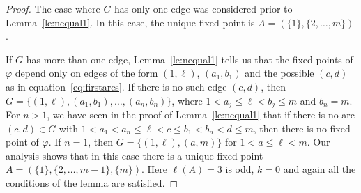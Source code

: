 \documentclass[10pt]{amsart}
\theoremstyle{definition}
\begin{document}
\begin{proof} 

The case where $G$ has only one edge was considered prior to Lemma~\ref{le:nequal1}. In this case, the unique fixed point is $A=(\{1\},\{2,\ldots,m\})$. 

If $G$ has more than one edge,
Lemma~\ref{le:nequal1} tells us that the fixed points of $\varphi$ depend only on edges of the form
$(1,\ell)$, $(a_1,b_1)$ and the possible $(c,d)$ as in equation~\eqref{eq:firstarcs}. If there is no such edge $(c,d)$, then 
$G=\big\{(1,\ell),(a_1,b_1),\ldots,(a_n,b_n)\big\}$, where $1<a_j\le \ell<b_j\le m$ and $b_n=m$.
For $n>1$, we have seen in the proof of Lemma~\ref{le:nequal1} that if there is no arc $(c,d)\in G$ with $ 1<a_1<a_n \le\ell <c\le b_1<b_n<d\le m$, then there is no fixed point of $\varphi$. 
If $n=1$, then $G=\big\{(1,\ell),(a,m)\big\}$ for $1<a\le \ell<m$. Our analysis shows that in this case there is a unique fixed point $A=(\{1\},\{2,\ldots,m-1\},\{m\})$. Here $\ell(A)=3$ is odd, $k=0$ and 
again all the conditions of the lemma are satisfied.


\end{proof}
\end{document}
